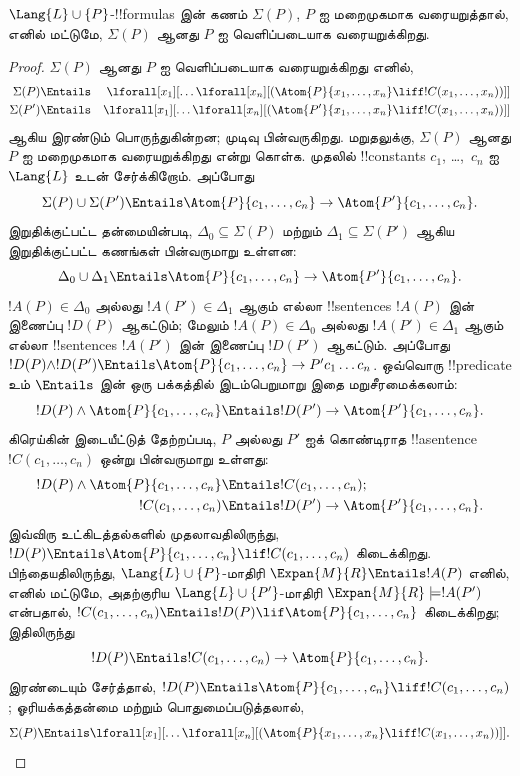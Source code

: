 \documentclass[../../../include/open-logic-section]{subfiles}
\begin{document}
\begin{thm}[பெத் வரையறுக்கத்தக்கமைத் தேற்றம்]
$\Lang{L}
  \cup\{P\}$-!!{formula}s இன் கணம் $\Sigma(P)$, $P$ ஐ மறைமுகமாக
வரையறுத்தால், எனில் மட்டுமே, $\Sigma(P)$ ஆனது $P$ ஐ வெளிப்படையாக
வரையறுக்கிறது.
\end{thm}

\begin{proof}
$\Sigma(P)$ ஆனது $P$ ஐ வெளிப்படையாக வரையறுக்கிறது எனில்,
\begin{align*}
  \Sigma(P) & \Entails & \lforall[x_1][\dots \lforall[x_n]
    [(\Atom{P}{x_1,\dots, x_n} \liff !C(x_1,\dots,x_n))]]\\
  \Sigma(P') & \Entails & \lforall[x_1][\dots \lforall[x_n]
    [(\Atom{P'}{x_1,\dots, x_n} \liff !C(x_1,\dots,x_n))]]
\end{align*}
ஆகிய இரண்டும் பொருந்துகின்றன; முடிவு பின்வருகிறது. மறுதலுக்கு,
$\Sigma(P)$ ஆனது $P$ ஐ மறைமுகமாக வரையறுக்கிறது என்று கொள்க.
முதலில் !!{constant}s $c_1$, \dots,~$c_n$ ஐ $\Lang{L}$ உடன்
சேர்க்கிறோம். அப்போது
\[
\Sigma(P) \cup \Sigma(P') \Entails
\Atom{P}{c_1, \dots, c_n} \to  \Atom{P'}{c_1, \dots, c_n}.
\]
இறுதிக்குட்பட்ட தன்மையின்படி, $\Delta_0 \subseteq \Sigma(P)$ மற்றும்
$\Delta_1 \subseteq \Sigma(P')$ ஆகிய இறுதிக்குட்பட்ட கணங்கள்
பின்வருமாறு உள்ளன:
\[
\Delta_0 \cup \Delta_1 \Entails
\Atom{P}{c_1, \dots, c_n} \to \Atom{P'}{c_1, \dots, c_n}.
\]
$!A(P) \in \Delta_0$ அல்லது $!A(P') \in \Delta_1$ ஆகும் எல்லா
!!{sentence}s $!A(P)$ இன் இணைப்பு $!D(P)$ ஆகட்டும்; மேலும்
$!A(P) \in \Delta_0$ அல்லது $!A(P') \in \Delta_1$ ஆகும் எல்லா
!!{sentence}s $!A(P')$ இன் இணைப்பு $!D(P')$ ஆகட்டும். அப்போது
$!D(P) \land
!D(P') \Entails \Atom{P}{c_1, \dots, c_n} \to P'c_1\dots c_n$.
ஒவ்வொரு !!{predicate} உம் $\Entails$ இன் ஒரு பக்கத்தில் இடம்பெறுமாறு
இதை மறுசீரமைக்கலாம்:
\[
!D(P) \land \Atom{P}{c_1, \dots, c_n} \Entails
!D(P') \to \Atom{P'}{c_1, \dots, c_n}.
\]
கிரெய்கின் இடையீட்டுத் தேற்றப்படி, $P$ அல்லது $P'$ ஐக் கொண்டிராத
!!a{sentence} $!C(c_1,\dots, c_n)$ ஒன்று பின்வருமாறு உள்ளது:
\begin{align*}
  !D(P) \land \Atom{P}{c_1, \dots, c_n} & \Entails !C(c_1,\dots, c_n); \\
  !C(c_1,\dots, c_n) & \Entails !D(P') \to \Atom{P'}{c_1, \dots, c_n}.
\end{align*}
இவ்விரு உட்கிடத்தல்களில் முதலாவதிலிருந்து,
$!D(P) \Entails
\Atom{P}{c_1,\dots, c_n} \lif !C(c_1,\dots, c_n)$ கிடைக்கிறது.
பிந்தையதிலிருந்து, $\Lang{L} \cup \{P\}$-மாதிரி
$\Expan{M}{R}
\Entails !A(P)$ எனில், எனில் மட்டுமே, அதற்குரிய
$\Lang{L} \cup
\{P'\}$-மாதிரி $\Expan{M}{R} \models !A(P')$ என்பதால்,
$!C(c_1,\dots, c_n) \Entails !D(P) \lif \Atom{P}{c_1,\dots, c_n}$
கிடைக்கிறது; இதிலிருந்து
\[
!D(P) \Entails !C(c_1,\dots,c_n) \to \Atom{P}{c_1,\dots, c_n}.
\]
இரண்டையும் சேர்த்தால்,
$!D(P) \Entails \Atom{P}{c_1,\dots, c_n}
\liff !C(c_1, \dots, c_n)$; ஓரியக்கத்தன்மை மற்றும்
பொதுமைப்படுத்தலால்,
\[
\Sigma(P) \Entails
\lforall[x_1][\dots\lforall[x_n][(\Atom{P}{x_1,\dots, x_n} \liff
    !C(x_1,\dots, x_n))]].
\]
\end{proof}
\end{document}

